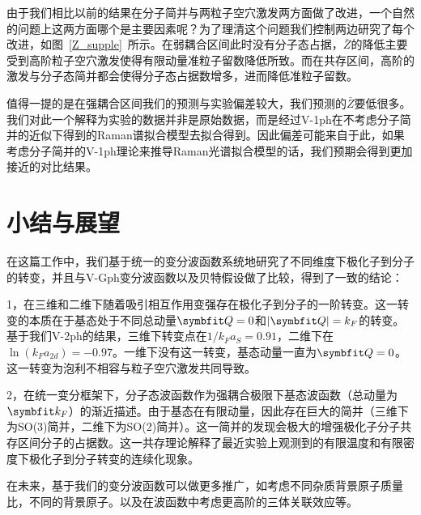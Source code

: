 由于我们相比以前的结果在分子简并与两粒子空穴激发两方面做了改进，一个自然的问题上这两方面哪个是主要因素呢？为了理清这个问题我们控制两边研究了每个改进，如图~\ref{Z_supple}~所示。在弱耦合区间此时没有分子态占据，$\bar{Z}$的降低主要受到高阶粒子空穴激发使得有限动量准粒子留数降低所致。而在共存区间，高阶的激发与分子态简并都会使得分子态占据数增多，进而降低准粒子留数。

值得一提的是在强耦合区间我们的预测与实验偏差较大，我们预测的$\bar{Z}$要低很多。我们对此一个解释为实验的数据并非是原始数据，而是经过V-1ph在不考虑分子简并的近似下得到的Raman谱拟合模型去拟合得到。因此偏差可能来自于此，如果考虑分子简并的V-1ph理论来推导Raman光谱拟合模型的话，我们预期会得到更加接近的对比结果。


\section{小结与展望}
在这篇工作中，我们基于统一的变分波函数系统地研究了不同维度下极化子到分子的转变，并且与V-Gph变分波函数以及贝特假设做了比较，得到了一致的结论：

1，在三维和二维下随着吸引相互作用变强存在极化子到分子的一阶转变。这一转变的本质在于基态处于不同总动量$\Vector{Q}=0$和$|\Vector{Q}|=k_F$的转变。基于我们V-2ph的结果，三维下转变点在$1/k_Fa_S=0.91$，二维下在$\ln(k_Fa_{2d})= -0.97$。一维下没有这一转变，基态动量一直为$\Vector{Q}=0$。这一转变为泡利不相容与粒子空穴激发共同导致。

2，在统一变分框架下，分子态波函数作为强耦合极限下基态波函数（总动量为$\Vector{k_F}$）的渐近描述。由于基态在有限动量，因此存在巨大的简并（三维下为SO(3)简并，二维下为SO(2)简并）。这一简并的发现会极大的增强极化子分子共存区间分子的占据数。这一共存理论解释了最近实验上观测到的有限温度和有限密度下极化子到分子转变的连续化现象。

在未来，基于我们的变分波函数可以做更多推广，如考虑不同杂质背景原子质量比，不同的背景原子。以及在波函数中考虑更高阶的三体关联效应等。


